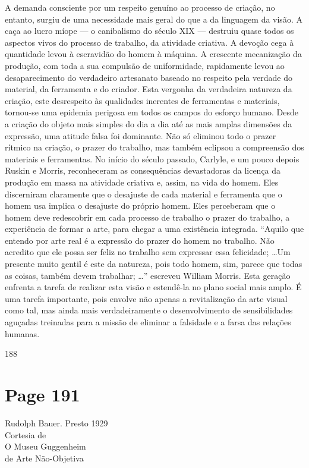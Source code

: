 \documentclass[a4paper]{article}
\begin{document}
A demanda consciente por um respeito genuíno ao processo de criação, no entanto, surgiu de uma necessidade mais geral do que a da linguagem da visão. A caça ao lucro míope --- o canibalismo do século XIX --- destruiu quase todos os aspectos vivos do processo de trabalho, da atividade criativa. A devoção cega à quantidade levou à escravidão do homem à máquina. A crescente mecanização da produção, com toda a sua compulsão de uniformidade, rapidamente levou ao desaparecimento do verdadeiro artesanato baseado no respeito pela verdade do material, da ferramenta e do criador. Esta vergonha da verdadeira natureza da criação, este desrespeito às qualidades inerentes de ferramentas e materiais, tornou-se uma epidemia perigosa em todos os campos do esforço humano. Desde a criação do objeto mais simples do dia a dia até as mais amplas dimensões da expressão, uma atitude falsa foi dominante. Não só eliminou todo o prazer rítmico na criação, o prazer do trabalho, mas também eclipsou a compreensão dos materiais e ferramentas. No início do século passado, Carlyle, e um pouco depois Ruskin e Morris, reconheceram as consequências devastadoras da licença da produção em massa na atividade criativa e, assim, na vida do homem. Eles discerniram claramente que o desajuste de cada material e ferramenta que o homem usa implica o desajuste do próprio homem. Eles perceberam que o homem deve redescobrir em cada processo de trabalho o prazer do trabalho, a experiência de formar a arte, para chegar a uma existência integrada. ``Aquilo que entendo por arte real é a expressão do prazer do homem no trabalho. Não acredito que ele possa ser feliz no trabalho sem expressar essa felicidade; \dots Um presente muito gentil é este da natureza, pois todo homem, sim, parece que todas as coisas, também devem trabalhar; \dots'' escreveu William Morris. Esta geração enfrenta a tarefa de realizar esta visão e estendê-la no plano social mais amplo. É uma tarefa importante, pois envolve não apenas a revitalização da arte visual como tal, mas ainda mais verdadeiramente o desenvolvimento de sensibilidades aguçadas treinadas para a missão de eliminar a falsidade e a farsa das relações humanas.

188

\newpage
\section*{Page 191}

\begin{raggedright}
Rudolph Bauer. Presto 1929\\
Cortesia de\\
O Museu Guggenheim\\
de Arte Não-Objetiva
\end{raggedright}
\end{document}
